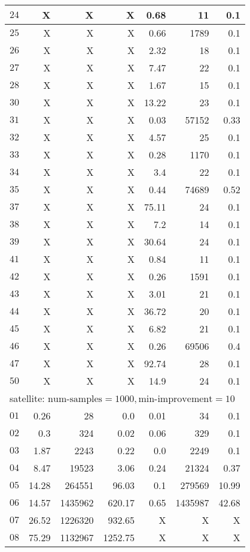 \begin{longtable}{|c||r|r|r||r|r|r|}
$24$ &  X &  X &  X & 0.68 & 11 & 0.1 \\\hline
$25$ &  X &  X &  X & 0.66 & 1789 & 0.1 \\\hline
$26$ &  X &  X &  X & 2.32 & 18 & 0.1 \\\hline
$27$ &  X &  X &  X & 7.47 & 22 & 0.1 \\\hline
$28$ &  X &  X &  X & 1.67 & 15 & 0.1 \\\hline
$30$ &  X &  X &  X & 13.22 & 23 & 0.1 \\\hline
$31$ &  X &  X &  X & 0.03 & 57152 & 0.33 \\\hline
$32$ &  X &  X &  X & 4.57 & 25 & 0.1 \\\hline
$33$ &  X &  X &  X & 0.28 & 1170 & 0.1 \\\hline
$34$ &  X &  X &  X & 3.4 & 22 & 0.1 \\\hline
$35$ &  X &  X &  X & 0.44 & 74689 & 0.52 \\\hline
$37$ &  X &  X &  X & 75.11 & 24 & 0.1 \\\hline
$38$ &  X &  X &  X & 7.2 & 14 & 0.1 \\\hline
$39$ &  X &  X &  X & 30.64 & 24 & 0.1 \\\hline
$41$ &  X &  X &  X & 0.84 & 11 & 0.1 \\\hline
$42$ &  X &  X &  X & 0.26 & 1591 & 0.1 \\\hline
$43$ &  X &  X &  X & 3.01 & 21 & 0.1 \\\hline
$44$ &  X &  X &  X & 36.72 & 20 & 0.1 \\\hline
$45$ &  X &  X &  X & 6.82 & 21 & 0.1 \\\hline
$46$ &  X &  X &  X & 0.26 & 69506 & 0.4 \\\hline
$47$ &  X &  X &  X & 92.74 & 28 & 0.1 \\\hline
$50$ &  X &  X &  X & 14.9 & 24 & 0.1 \\\hline

\multicolumn{7}{|l|}{satellite: $\text{num-samples}=1000,\text{min-improvement}=10$}\\\hline
$01$ & 0.26 & 28 & 0.0 & 0.01 & 34 & 0.1 \\\hline
$02$ & 0.3 & 324 & 0.02 & 0.06 & 329 & 0.1 \\\hline
$03$ & 1.87 & 2243 & 0.22 & 0.0 & 2249 & 0.1 \\\hline
$04$ & 8.47 & 19523 & 3.06 & 0.24 & 21324 & 0.37 \\\hline
$05$ & 14.28 & 264551 & 96.03 & 0.1 & 279569 & 10.99 \\\hline
$06$ & 14.57 & 1435962 & 620.17 & 0.65 & 1435987 & 42.68 \\\hline
$07$ & 26.52 & 1226320 & 932.65 & X & X & X \\\hline
$08$ & 75.29 & 1132967 & 1252.75 & X & X & X \\\hline


\end{longtable}
